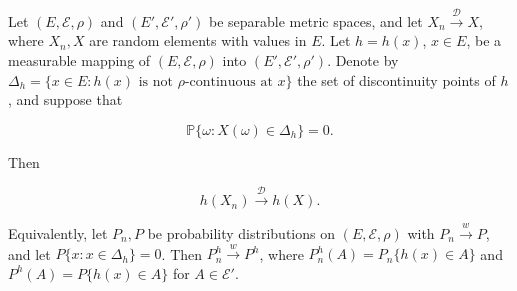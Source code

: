 Let $(E, \mathcal{E}, \rho)$ and $(E', \mathcal{E}', \rho')$ be separable metric spaces, and let $X_n \xrightarrow{\mathcal{D}} X$, where $X_n, X$ are random elements with values in $E$. Let $h = h(x)$, $x \in E$, be a measurable mapping of $(E, \mathcal{E}, \rho)$ into $(E', \mathcal{E}', \rho')$. Denote by $\Delta_h = \{x \in E : h(x) \text{ is not } \rho\text{-continuous at } x\}$ the set of discontinuity points of $h$, and suppose that

$$\mathbb{P}\{\omega : X(\omega) \in \Delta_h\} = 0.$$

Then

$$h(X_n) \xrightarrow{\mathcal{D}} h(X).$$

Equivalently, let $P_n, P$ be probability distributions on $(E, \mathcal{E}, \rho)$ with $P_n \xrightarrow{w} P$, and let $P\{x : x \in \Delta_h\} = 0$. Then $P_n^h \xrightarrow{w} P^h$, where $P_n^h(A) = P_n\{h(x) \in A\}$ and $P^h(A) = P\{h(x) \in A\}$ for $A \in \mathcal{E}'$.
